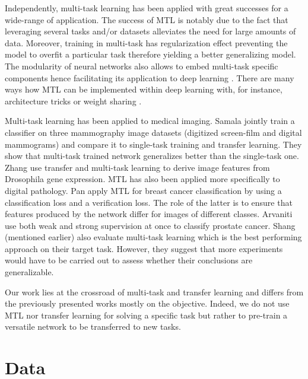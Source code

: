 Independently, multi-task learning \cite{zhang2017survey} has been applied with great successes for a wide-range of application. The success of MTL is notably due to the fact that leveraging several tasks and/or datasets alleviates the need for large amounts of data. Moreover, training in multi-task has regularization effect preventing the model to overfit a particular task therefore yielding a better generalizing model. The modularity of neural networks also allows to embed multi-task specific components hence facilitating its application to deep learning \cite{caruana1997multitask, zhang2017survey}. There are many ways how MTL can be implemented within deep learning with, for instance, architecture tricks \cite{misra2016cross, strezoski2019many} or weight sharing \cite{caruana1997multitask}. 

Multi-task learning has been applied to medical imaging. Samala \etal \cite{samala2017multi} jointly train a classifier on three mammography image datasets (digitized screen-film and digital mammograms) and compare it to single-task training and transfer learning. They show that multi-task trained network generalizes better than the single-task one. Zhang \etal \cite{zhang2016deep} use transfer and multi-task learning to derive image features from Drosophila gene expression. MTL has also been applied more specifically to digital pathology. Pan \etal \cite{pan2018multi} apply MTL for breast cancer classification by using a classification loss and a verification loss. The role of the latter is to ensure that features produced by the network differ for images of different classes. Arvaniti \etal \cite{arvaniti2018coupling} use both weak and strong supervision at once to classify prostate cancer. Shang \etal (mentioned earlier) also evaluate multi-task learning which is the best performing approach on their target task. However, they suggest that more experiments would have to be carried out to assess whether their conclusions are generalizable.

Our work lies at the crossroad of multi-task and transfer learning and differs from the previously presented works mostly on the objective. Indeed, we do not use MTL nor transfer learning for solving a specific task but rather to pre-train a versatile network to be transferred to new tasks. 

\section{Data}
\label{sec:mtask:data}


